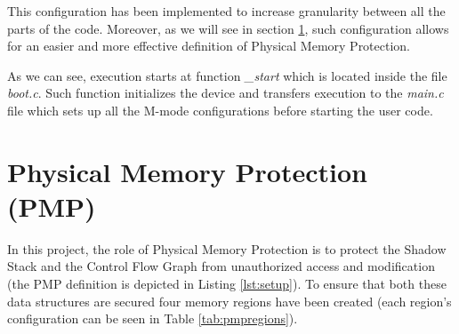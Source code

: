 This configuration has been implemented to increase granularity between all the
parts of the code. Moreover, as we will see in section \ref{sec:project_pmp}, such
configuration allows for an easier and more effective definition of Physical Memory
Protection.

As we can see, execution starts at function \textit{\_start} which is located inside
the file \textit{boot.c}. Such function initializes the device and transfers execution
to the \textit{main.c} file which sets up all the M-mode configurations before
starting the user code.

\section{Physical Memory Protection (PMP)}
\label{sec:project_pmp}

In this project, the role of Physical Memory Protection is to protect the Shadow
Stack and the Control Flow Graph from unauthorized access and modification (the PMP
definition is depicted in Listing \ref{lst:setup}). To ensure that both these data
structures are secured four memory regions have been created (each region's
configuration can be seen in Table \ref{tab:pmpregions}).

